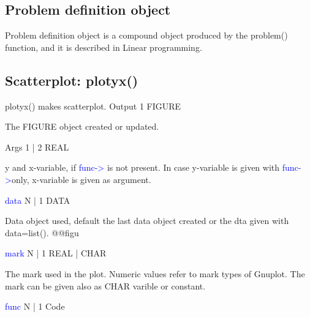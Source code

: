 \subsection{Problem definition object}
\label{problemo}
Problem definition object is a compound object produced by the \textcolor{VioletRed}{problem}() function, and it is
described in Linear programming.
\subsection{Scatterplot: \textcolor{VioletRed}{plotyx}()}
\label{plotyx}
\textcolor{VioletRed}{plotyx}() makes scatterplot.
\vspace{0.3cm}
\hline
\vspace{0.3cm}
\noindent Output  \tabto{3cm}  1 \tabto{5cm}   FIGURE  \tabto{7cm}
\begin{changemargin}{3cm}{0cm}
\noindent  The FIGURE object created or updated.
\end{changemargin}
\vspace{0.3cm}
\hline
\vspace{0.3cm}
\noindent Args  \tabto{3cm}  1 | 2  \tabto{5cm}   REAL  \tabto{7cm}
\begin{changemargin}{3cm}{0cm}
\noindent  y and x-variable, if \textcolor{blue}{func->} is not present.
In case y-variable is given with \textcolor{blue}{func->}only,  x-variable is given as argument.
\end{changemargin}
\vspace{0.3cm}
\hline
\vspace{0.3cm}
\noindent \textcolor{blue}{data}  \tabto{3cm}  N | 1  \tabto{5cm}   DATA  \tabto{7cm}
\begin{changemargin}{3cm}{0cm}
\noindent  Data object used, default the last data object created or the dta given
with data=\textcolor{VioletRed}{list}().
@@figu
\end{changemargin}
\vspace{0.3cm}
\hline
\vspace{0.3cm}
\noindent \textcolor{blue}{mark}  \tabto{3cm}  N | 1  \tabto{5cm}   REAL | CHAR  \tabto{7cm}
\begin{changemargin}{3cm}{0cm}
\noindent  The mark used in the plot. Numeric values refer to
mark types of Gnuplot. The mark can be given also as CHAR varible or constant.
\end{changemargin}
\vspace{0.3cm}
\hline
\vspace{0.3cm}
\noindent \textcolor{blue}{func} \tabto{3cm}  N | 1  \tabto{5cm}   Code  \tabto{7cm}
